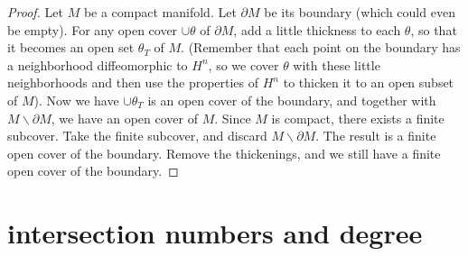 \documentclass[11pt]{amsbook}
\theoremstyle{mystyle} %
\numberwithin{thm}{section}
\newcommand{\minus}{\smallsetminus}
\renewcommand{\d}{\partial}
\begin{document}
\begin{proof}
	Let $M$ be a compact manifold.  Let $\d M$ be its boundary (which could even be empty).  For any open cover $\cup \theta$ of $\d M$, add a little thickness to each $\theta$, so that it becomes an open set $\theta_T$ of $M$.  (Remember that each point on the boundary has a neighborhood diffeomorphic to $H^n$, so we cover $\theta$ with these little neighborhoods and then use the properties of $H^n$ to thicken it to an open subset of $M$).  Now we have $\cup \theta_T$ is an open cover of the boundary, and together with $M \minus \d M$, we have an open cover of $M$.  Since $M$ is compact, there exists a finite subcover.  Take the finite subcover, and discard $M \minus \d M$.  The result is a finite open cover of the boundary.  Remove the thickenings, and we still have a finite open cover of the boundary.
\end{proof}

\section{intersection numbers and degree}
\end{document}

